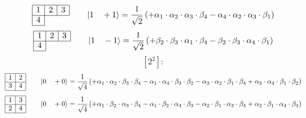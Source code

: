 \documentclass[fleqn]{article}%
\begin{document}
\vspace{0.25cm}%
\begin{dmath*}\begin{array}{|c|c|c|} \hline 1 & 2 & 3\\ \cline{1-3} 4\\ \cline{1-1} \end{array} \qquad \ket{ 1 \quad  +1 } = \frac{1}{\sqrt{2}} \left( + \alpha_{1} \cdot \alpha_{2} \cdot \alpha_{3} \cdot \beta_{4}  - \alpha_{4} \cdot \alpha_{2} \cdot \alpha_{3} \cdot \beta_{1}\right) \end{dmath*}%
\vspace{0.25cm}%
\begin{dmath*}\begin{array}{|c|c|c|} \hline 1 & 2 & 3\\ \cline{1-3} 4\\ \cline{1-1} \end{array} \qquad \ket{ 1 \quad  -1 } = \frac{1}{\sqrt{2}} \left( + \beta_{2} \cdot \beta_{3} \cdot \alpha_{1} \cdot \beta_{4}  - \beta_{2} \cdot \beta_{3} \cdot \alpha_{4} \cdot \beta_{1}\right) \end{dmath*}%
\vspace{0.25cm}%
\vspace{0.25cm}%
\vspace{0.25cm}%
\begin{dmath*}\left[2^2\right]:\end{dmath*}%
\vspace{0.25cm}%
\begin{dmath*}\begin{array}{|c|c|} \hline 1 & 2\\ \cline{1-2} 3 & 4\\ \cline{1-2} \end{array} \qquad \ket{ 0 \quad  +0 } = \frac{1}{\sqrt{4}} \left( + \alpha_{1} \cdot \alpha_{2} \cdot \beta_{3} \cdot \beta_{4}  - \alpha_{1} \cdot \alpha_{4} \cdot \beta_{3} \cdot \beta_{2}  - \alpha_{3} \cdot \alpha_{2} \cdot \beta_{1} \cdot \beta_{4}  + \alpha_{3} \cdot \alpha_{4} \cdot \beta_{1} \cdot \beta_{2}\right) \end{dmath*}%
\vspace{0.25cm}%
\begin{dmath*}\begin{array}{|c|c|} \hline 1 & 3\\ \cline{1-2} 2 & 4\\ \cline{1-2} \end{array} \qquad \ket{ 0 \quad  +0 } = \frac{1}{\sqrt{4}} \left( + \alpha_{1} \cdot \beta_{2} \cdot \alpha_{3} \cdot \beta_{4}  - \alpha_{1} \cdot \beta_{2} \cdot \alpha_{4} \cdot \beta_{3}  - \alpha_{2} \cdot \beta_{1} \cdot \alpha_{3} \cdot \beta_{4}  + \alpha_{2} \cdot \beta_{1} \cdot \alpha_{4} \cdot \beta_{3}\right) \end{dmath*}%
\end{document}
